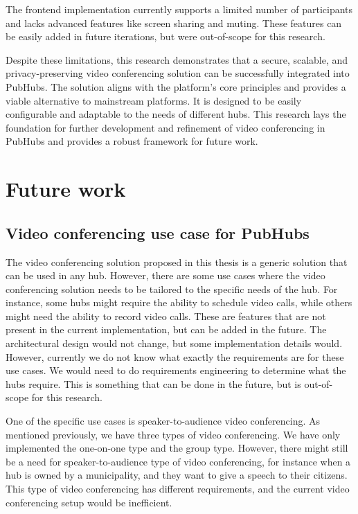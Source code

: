 \documentclass{report}
\begin{document}
The frontend implementation currently supports a limited number of participants and lacks advanced features like
screen sharing and muting. These features can be easily added in future iterations, but were out-of-scope for this
research.

Despite these limitations, this research demonstrates that a secure, scalable, and privacy-preserving video
conferencing solution can be successfully integrated into PubHubs. The solution aligns with the platform’s core
principles and provides a viable alternative to mainstream platforms. It is designed to be easily configurable and
adaptable to the needs of different hubs. This research lays the foundation for further development and refinement
of video conferencing in PubHubs and provides a robust framework for future work.

\chapter{Future work}
\section{Video conferencing use case for PubHubs}
The video conferencing solution proposed in this thesis is a generic solution that can be used in any hub. However,
there are some use cases where the video conferencing solution needs to be tailored to the specific needs of the hub.
For instance, some hubs might require the ability to schedule video calls, while others might need the ability to
record video calls. These are features that are not present in the current implementation, but can be added in the
future. The architectural design would not change, but some implementation details would. However, currently we do not
know what exactly the requirements are for these use cases. We would need to do requirements engineering to determine
what the hubs require. This is something that can be done in the future, but is out-of-scope for this research.

One of the specific use cases is speaker-to-audience video conferencing. As mentioned previously, we have three
types of video conferencing. We have only implemented the one-on-one type and the group type. However, there might
still be a need for speaker-to-audience type of video conferencing, for instance when a hub is owned by a
municipality, and they want to give a speech to their citizens. This type of video conferencing has different
requirements, and the current video conferencing setup would be inefficient.
\end{document}
